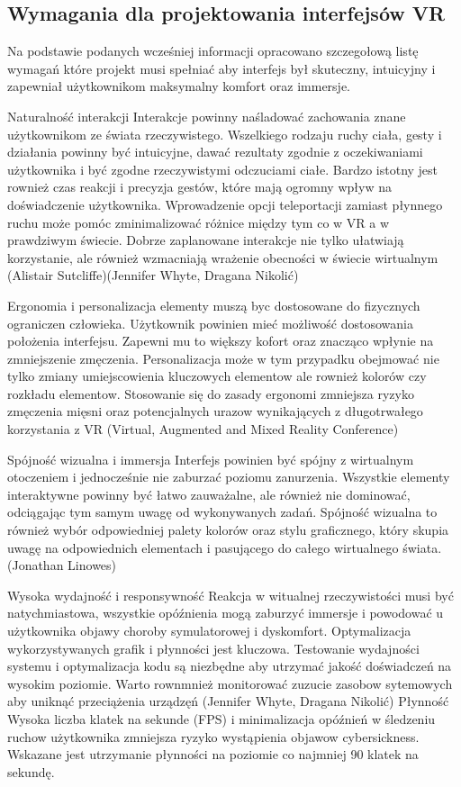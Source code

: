 \subsection{Wymagania dla projektowania interfejsów VR}

Na podstawie podanych wcześniej informacji opracowano szczegołową listę wymagań które projekt musi spełniać aby interfejs był skuteczny, intuicyjny i zapewniał użytkownikom maksymalny komfort oraz immersje. 

Naturalność interakcji
Interakcje powinny naśladować  zachowania znane użytkownikom ze świata rzeczywistego. Wszelkiego rodzaju ruchy ciała, gesty i działania powinny być intuicyjne, dawać rezultaty zgodnie z oczekiwaniami użytkownika i być zgodne rzeczywistymi odczuciami ciałe. Bardzo istotny jest rownież czas reakcji i precyzja gestów, które mają ogromny wpływ na doświadczenie użytkownika. Wprowadzenie opcji teleportacji zamiast płynnego ruchu może pomóc zminimalizować różnice między tym co w VR a w prawdziwym świecie. Dobrze zaplanowane interakcje nie tylko ułatwiają korzystanie, ale również wzmacniają wrażenie obecności w świecie wirtualnym (Alistair Sutcliffe)(Jennifer Whyte, Dragana Nikolić)

Ergonomia i personalizacja
elementy muszą byc dostosowane do fizycznych ograniczen człowieka. Użytkownik powinien mieć możliwość dostosowania położenia interfejsu. Zapewni mu to większy kofort oraz znacząco wpłynie na zmniejszenie zmęczenia. Personalizacja może w tym przypadku obejmować nie tylko zmiany umiejscowienia kluczowych elementow ale rownież kolorów czy rozkładu elementow. Stosowanie się do zasady ergonomi zmniejsza ryzyko zmęczenia mięsni oraz potencjalnych urazow wynikających z długotrwałego korzystania z VR (Virtual, Augmented and Mixed Reality Conference)

Spójność wizualna i immersja
Interfejs powinien być spójny z wirtualnym otoczeniem i jednocześnie nie zaburzać poziomu zanurzenia. Wszystkie elementy interaktywne powinny być łatwo zauważalne, ale również nie dominować, odciągając tym samym uwagę od wykonywanych zadań.
Spójność wizualna to również wybór odpowiedniej palety kolorów oraz stylu graficznego, który skupia uwagę na odpowiednich elementach i pasującego do całego wirtualnego świata.
(Jonathan Linowes)

Wysoka wydajność i responsywność
Reakcja w witualnej rzeczywistości musi być natychmiastowa, wszystkie opóźnienia mogą zaburzyć immersje i powodować u użytkownika objawy choroby symulatorowej i dyskomfort. Optymalizacja wykorzystywanych grafik i płynności jest kluczowa. Testowanie wydajności systemu i optymalizacja kodu są niezbędne aby  utrzymać jakość doświadczeń na wysokim poziomie. Warto rownmnież monitorować zuzucie zasobow sytemowych aby uniknąć przeciążenia urządzęń (Jennifer Whyte, Dragana Nikolić)
Płynność
Wysoka liczba klatek na sekunde (FPS) i minimalizacja opóźnień w śledzeniu ruchow użytkownika zmniejsza ryzyko wystąpienia objawow cybersickness. Wskazane jest utrzymanie płynności na poziomie co najmniej 90 klatek na sekundę.


